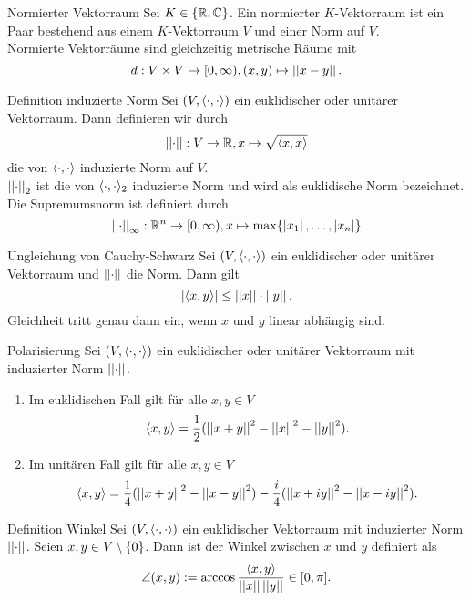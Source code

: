 \documentclass[main.tex]{subfiles}
\begin{document}
\begin{karte}{Normierter Vektorraum}
    Sei \(K \in \{\mathbb{R}, \mathbb{C}\}\). Ein normierter \(K\)-Vektorraum ist ein Paar bestehend
    aus einem \(K\)-Vektorraum \(V\) und einer Norm auf \(V\).\\
    Normierte Vektorräume sind gleichzeitig metrische Räume mit
    \[ d : V\times V \rightarrow [0, \infty), (x, y) \mapsto \left|\left|x-y\right|\right|. \]
\end{karte}

\begin{karte}{Definition induzierte Norm}
    Sei \((V, \langle \cdot, \cdot \rangle)\) ein euklidischer oder unitärer Vektorraum.
    Dann definieren wir durch
    \[ \left|\left|\cdot\right|\right| : V \rightarrow \mathbb{R}, x \mapsto \sqrt{\langle x, x \rangle} \]
    die von \(\langle \cdot, \cdot \rangle\) induzierte Norm auf \(V\).\\
    \(\left|\left|\cdot\right|\right|_2\) ist die von \(\langle \cdot, \cdot \rangle_2\) induzierte Norm und
    wird als euklidische Norm bezeichnet.\\
    Die Supremumsnorm ist definiert durch 
    \[ \left|\left|\cdot\right|\right|_\infty : \mathbb{R}^n \rightarrow [0,\infty), x \mapsto \max\{\left| x_1 \right|, \ldots, \left| x_n \right|\} \]
\end{karte}

\begin{karte}{Ungleichung von Cauchy-Schwarz}
    Sei \((V, \langle \cdot, \cdot \rangle)\) ein euklidischer oder unitärer Vektorraum
    und \(\left|\left|\cdot\right|\right|\) die Norm. Dann gilt
    \[ \left| \langle x, y \rangle \right| \leq \left|\left|x\right|\right| \cdot \left|\left|y\right|\right|. \]
    Gleichheit tritt genau dann ein, wenn \(x\) und \(y\) linear abhängig sind.
\end{karte}

\begin{karte}{Polarisierung}
    Sei \((V, \langle \cdot, \cdot \rangle)\) ein euklidischer oder unitärer Vektorraum mit induzierter
    Norm \(\left|\left|\cdot\right|\right|\).
    \begin{enumerate}
        \item Im euklidischen Fall gilt für alle \(x, y \in V\)
        \[ \langle x, y \rangle = \frac{1}{2}(\left|\left|x+y\right|\right|^2-\left|\left|x\right|\right|^2-\left|\left|y\right|\right|^2). \]
        \item Im unitären Fall gilt für alle \(x, y \in V\)
        \[ \langle x, y \rangle = \frac{1}{4}(\left|\left|x+y\right|\right|^2-\left|\left|x-y\right|\right|^2) 
        - \frac{i}{4}(\left|\left|x+iy\right|\right|^2-\left|\left|x-iy\right|\right|^2). \]
    \end{enumerate}
\end{karte}

\begin{karte}{Definition Winkel}
    Sei \((V, \langle \cdot, \cdot \rangle)\) ein euklidischer Vektorraum mit induzierter Norm \(\left|\left|\cdot\right|\right|\).
    Seien \(x, y \in V \setminus \{0\}\). Dann ist der Winkel zwischen \(x\) und \(y\) definiert als
    \[ \angle (x,y) := \arccos \frac{\langle x, y \rangle}{\left|\left|x\right|\right| \left|\left|y\right|\right|} \in [0, \pi]. \]
\end{karte}
\end{document}
